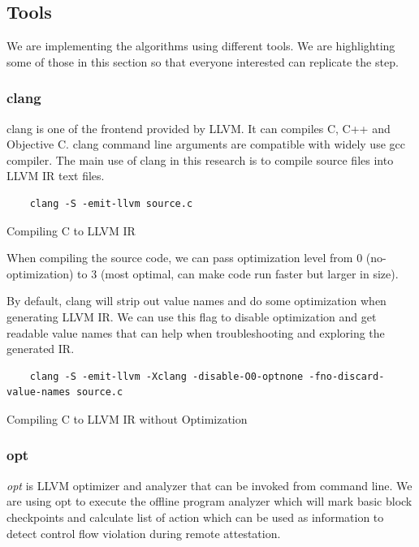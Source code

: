 \subsection{Tools}

We are implementing the algorithms using different tools. We are highlighting some of those in this section so that everyone interested can replicate the step.

\subsubsection{clang}

clang is one of the frontend provided by LLVM. It can compiles C, C++ and Objective C. clang command line arguments are compatible with widely use gcc compiler. The main use of clang in this research is to compile source files into LLVM IR text files.

\begin{listing}
\begin{verbatim}
    clang -S -emit-llvm source.c
\end{verbatim}
\caption{Compiling C to LLVM IR}    
\label{listing:2-7}
\end{listing}
    
When compiling the source code, we can pass optimization level from 0 (no-optimization) to 3 (most optimal, can make code run faster but larger in size).  

By default, clang will strip out value names and do some optimization when generating LLVM IR. We can use this flag to disable optimization and get readable value names that can help when troubleshooting and exploring the generated IR.

\begin{listing}
\begin{verbatim}
    clang -S -emit-llvm -Xclang -disable-O0-optnone -fno-discard-value-names source.c
\end{verbatim}
\caption{Compiling C to LLVM IR without Optimization}    
\label{listing:2-8}
\end{listing}

\subsubsection{opt}

\emph{opt} is LLVM optimizer and analyzer that can be invoked from command line. We are using opt to execute the offline program analyzer which will mark basic block checkpoints and calculate list of action which can be used as information to detect control flow violation during remote attestation.

